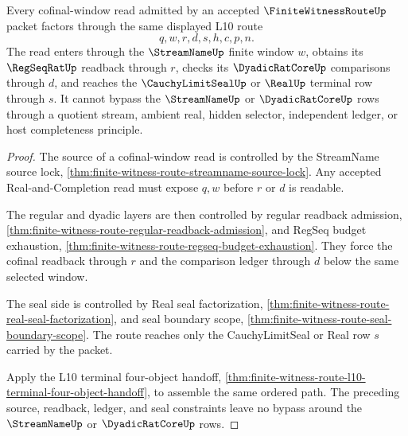 \begin{theorem}
\label{thm:finite-witness-route-cofinal-window-factorization}
Every cofinal-window read admitted by an accepted $\FiniteWitnessRouteUp$ packet factors through the same displayed L10 route
$$
q,w,r,d,s,h,c,p,n.
$$
The read enters through the $\StreamNameUp$ finite window $w$, obtains its $\RegSeqRatUp$ readback through $r$, checks its $\DyadicRatCoreUp$ comparisons through $d$, and reaches the $\CauchyLimitSealUp$ or $\RealUp$ terminal row through $s$. It cannot bypass the $\StreamNameUp$ or $\DyadicRatCoreUp$ rows through a quotient stream, ambient real, hidden selector, independent ledger, or host completeness principle.
\end{theorem}
\begin{proof}
The source of a cofinal-window read is controlled by the StreamName source lock, \autoref{thm:finite-witness-route-streamname-source-lock}. Any accepted Real-and-Completion read must expose $q,w$ before $r$ or $d$ is readable.

The regular and dyadic layers are then controlled by regular readback admission, \autoref{thm:finite-witness-route-regular-readback-admission}, and RegSeq budget exhaustion, \autoref{thm:finite-witness-route-regseq-budget-exhaustion}. They force the cofinal readback through $r$ and the comparison ledger through $d$ below the same selected window.

The seal side is controlled by Real seal factorization, \autoref{thm:finite-witness-route-real-seal-factorization}, and seal boundary scope, \autoref{thm:finite-witness-route-seal-boundary-scope}. The route reaches only the CauchyLimitSeal or Real row $s$ carried by the packet.

Apply the L10 terminal four-object handoff, \autoref{thm:finite-witness-route-l10-terminal-four-object-handoff}, to assemble the same ordered path. The preceding source, readback, ledger, and seal constraints leave no bypass around the $\StreamNameUp$ or $\DyadicRatCoreUp$ rows.
\end{proof}


